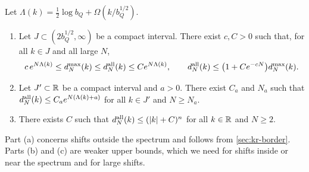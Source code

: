 \begin{lemma}\label{lem:mo-goe}
Let $\Lambda(k)=\frac12\log b_Q+\Omega(k/b_Q^{1/2})$.
\begin{enumerate}
\item[(a)] Let $J\subset(2b_Q^{1/2},\infty)$ be a compact interval. There exist $c,C>0$ such that, for all $k\in J$ and all large $N$,
\begin{equation}\label{eq:mo-det-gap}
c\,e^{N\Lambda(k)}\le d_N^{\max}(k)\le d_N^{\rm all}(k)\le Ce^{N\Lambda(k)},
\qquad
d_N^{\rm all}(k)\le\bigl(1+Ce^{-cN}\bigr)d_N^{\max}(k).
\end{equation}
\item[(b)] Let $J'\subset\mathbb R$ be a compact interval and $a>0$. There exist $C_a$ and $N_a$ such that $d_N^{\rm all}(k)\le C_ae^{N(\Lambda(k)+a)}$ for all $k\in J'$ and $N\ge N_a$.
\item[(c)] There exists $C$ such that $d_N^{\rm all}(k)\le(|k|+C)^n$ for all $k\in\mathbb R$ and $N\ge2$.
\end{enumerate}
\end{lemma}

Part (a) concerns shifts outside the spectrum and follows from \cref{sec:kr-border}. Parts (b) and (c) are weaker upper bounds, which we need for shifts inside or near the spectrum and for large shifts.

